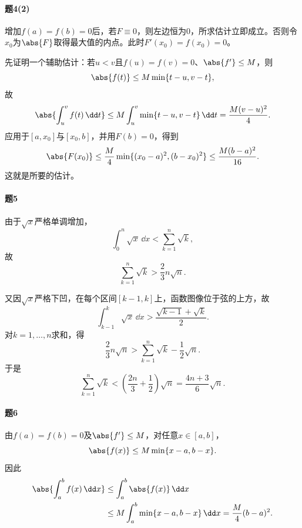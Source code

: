 \paragraph{题4(2)}
\begin{xsolution}
增加$f(a)=f(b)=0$后，若$F\equiv0$，则左边恒为0，所求估计立即成立。否则令$x_0$为$\abs{F}$取得最大值的内点。此时$F'(x_0)=f(x_0)=0$。

先证明一个辅助估计：若$u<v$且$f(u)=f(v)=0$、$\abs{f'}\le M$，则
\[
 \abs{f(t)}\le M\min\{t-u,v-t\},
\]
故
\[
 \abs{\int_u^vf(t)\,\dd t}
 \le M\int_u^v\min\{t-u,v-t\}\,\dd t
 =\frac{M(v-u)^2}{4}.
\]
应用于$[a,x_0]$与$[x_0,b]$，并用$F(b)=0$，得到
\[
 \abs{F(x_0)}
 \le\frac M4\min\{(x_0-a)^2,(b-x_0)^2\}
 \le\frac{M(b-a)^2}{16}.
\]
这就是所要的估计。
\end{xsolution}

\paragraph{题5}
\begin{xsolution}
由于$\sqrt x$严格单调增加，
\[
 \int_0^n\sqrt x\,\dd x
 <\sum_{k=1}^n\sqrt k,
\]
故
\[
 \sum_{k=1}^n\sqrt k>\frac23n\sqrt n.
\]

又因$\sqrt x$严格下凹，在每个区间$[k-1,k]$上，函数图像位于弦的上方，故
\[
 \int_{k-1}^k\sqrt x\,\dd x
 >\frac{\sqrt{k-1}+\sqrt k}{2}.
\]
对$k=1,\ldots,n$求和，得
\[
 \frac23n\sqrt n
 >\sum_{k=1}^n\sqrt k-\frac12\sqrt n.
\]
于是
\[
 \sum_{k=1}^n\sqrt k
 <\left(\frac{2n}{3}+\frac12\right)\sqrt n
 =\frac{4n+3}{6}\sqrt n.
\]
\end{xsolution}

\paragraph{题6}
\begin{xsolution}
由$f(a)=f(b)=0$及$\abs{f'}\le M$，对任意$x\in[a,b]$，
\[
 \abs{f(x)}\le M\min\{x-a,b-x\}.
\]
因此
\begin{align*}
\abs{\int_a^bf(x)\,\dd x}
&\le\int_a^b\abs{f(x)}\,\dd x\\
&\le M\int_a^b\min\{x-a,b-x\}\,\dd x
=\frac M4(b-a)^2.
\end{align*}
\end{xsolution}

